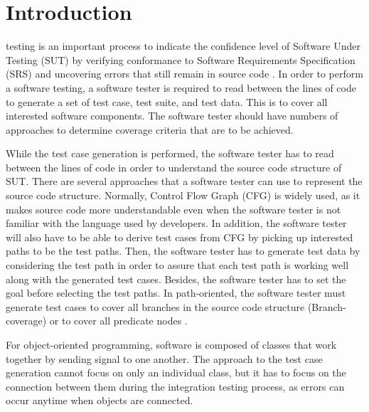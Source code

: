 \section{Introduction}
%
%
%
%
 testing is an important process 
to indicate the confidence level of Software Under Testing (SUT) 
by verifying conformance to Software Requirements Specification (SRS) 
and uncovering errors that still remain in source code \cite{Jorgensen2013}.
In order to perform a software testing, a software tester is required 
to read between the lines of code to generate a set of test case, test suite, 
and test data. This is to cover all interested software components. 
The software tester should have numbers of approaches to determine 
coverage criteria that are to be achieved.

While the test case generation is performed, the software tester has 
to read between the lines of code in order to understand 
the source code structure of SUT. There are several approaches 
that a software tester can use to represent the source code structure. 
Normally, Control Flow Graph (CFG) is widely used, as it makes source code 
more understandable even when the software tester is not familiar with 
the language used by developers. In addition, the software tester will 
also have to be able to derive test cases from CFG by picking up 
interested paths to be the test paths. Then, the software tester has to 
generate test data by considering the test path in order to assure 
that each test path is working well along with the generated test cases. 
Besides, the software tester has to set the goal before selecting the 
test paths. In path-oriented, the software tester must generate test cases 
to cover all branches in the source code structure (Branch-coverage) or 
to cover all predicate nodes \cite{Luanghirun2016}.

For object-oriented programming, software is composed of classes 
that work together by sending signal to one another. The approach to 
the test case generation cannot focus on only an individual class, 
but it has to focus on the connection between them during 
the integration testing process, as errors can occur anytime 
when objects are connected.


